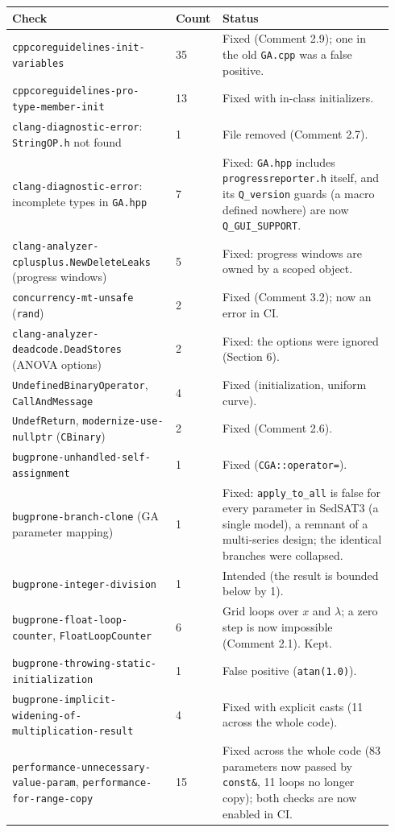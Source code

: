 \documentclass[11pt]{article}
\newcommand{\code}[1]{\texttt{#1}}
\begin{document}
{\small
\begin{longtable}{@{}p{0.42\linewidth}p{0.08\linewidth}p{0.44\linewidth}@{}}
\toprule
Check & Count & Status\\
\midrule
\endhead
\code{cppcoreguidelines-\allowbreak{}init-variables} & 35 & Fixed (Comment 2.9); one in the old \code{GA.\allowbreak{}cpp} was a false positive.\\
\code{cppcoreguidelines-\allowbreak{}pro-type-member-init} & 13 & Fixed with in-class initializers.\\
\code{clang-diagnostic-error}: \code{StringOP.\allowbreak{}h} not found & 1 & File removed (Comment 2.7).\\
\code{clang-diagnostic-error}: incomplete types in \code{GA.\allowbreak{}hpp} & 7 & Fixed: \code{GA.\allowbreak{}hpp} includes \code{progressreporter.\allowbreak{}h} itself, and its \code{Q\_\allowbreak{}version} guards (a macro defined nowhere) are now \code{Q\_\allowbreak{}GUI\_\allowbreak{}SUPPORT}.\\
\code{clang-analyzer-cplusplus.\allowbreak{}NewDeleteLeaks} (progress windows) & 5 & Fixed: progress windows are owned by a scoped object.\\
\code{concurrency-mt-unsafe} (\code{rand}) & 2 & Fixed (Comment 3.2); now an error in CI.\\
\code{clang-analyzer-deadcode.\allowbreak{}DeadStores} (ANOVA options) & 2 & Fixed: the options were ignored (Section 6).\\
\code{UndefinedBinaryOperator}, \code{CallAndMessage} & 4 & Fixed (initialization, uniform curve).\\
\code{UndefReturn}, \code{modernize-use-nullptr} (\code{CBinary}) & 2 & Fixed (Comment 2.6).\\
\code{bugprone-unhandled-self-assignment} & 1 & Fixed (\code{CGA::\allowbreak{}operator=}).\\
\code{bugprone-branch-clone} (GA parameter mapping) & 1 & Fixed: \code{apply\_\allowbreak{}to\_\allowbreak{}all} is false for every parameter in SedSAT3 (a single model), a remnant of a multi-series design; the identical branches were collapsed.\\
\code{bugprone-integer-division} & 1 & Intended (the result is bounded below by 1).\\
\code{bugprone-float-loop-counter}, \code{FloatLoopCounter} & 6 & Grid loops over $x$ and $\lambda$; a zero step is now impossible (Comment 2.1). Kept.\\
\code{bugprone-throwing-static-initialization} & 1 & False positive (\code{atan(1.0)}).\\
\code{bugprone-\allowbreak{}implicit-\allowbreak{}widening-\allowbreak{}of-\allowbreak{}multiplication-\allowbreak{}result} & 4 & Fixed with explicit casts (11 across the whole code).\\
\code{performance-\allowbreak{}unnecessary-value-param}, \code{performance-for-range-copy} & 15 & Fixed across the whole code (83 parameters now passed by \code{const\&}, 11 loops no longer copy); both checks are now enabled in CI.\\
\bottomrule
\end{longtable}
}
\end{document}

